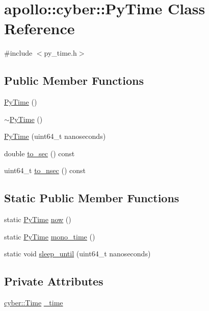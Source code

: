 \hypertarget{classapollo_1_1cyber_1_1PyTime}{\section{apollo\-:\-:cyber\-:\-:Py\-Time Class Reference}
\label{classapollo_1_1cyber_1_1PyTime}
}


{\ttfamily \#include $<$py\-\_\-time.\-h$>$}

\subsection*{Public Member Functions}
\begin{DoxyCompactItemize}
\item 
\hyperlink{classapollo_1_1cyber_1_1PyTime_a35a7960faebd80925edf9c5df85a3b88}{Py\-Time} ()
\item 
\hyperlink{classapollo_1_1cyber_1_1PyTime_a5d2dc973e2d3628f9514b574cd9bc074}{$\sim$\-Py\-Time} ()
\item 
\hyperlink{classapollo_1_1cyber_1_1PyTime_aed9e55ac8f5b448b52187cd417013163}{Py\-Time} (uint64\-\_\-t nanoseconds)
\item 
double \hyperlink{classapollo_1_1cyber_1_1PyTime_a04d9998cb3c386d3e64f6132f3560e5a}{to\-\_\-sec} () const 
\item 
uint64\-\_\-t \hyperlink{classapollo_1_1cyber_1_1PyTime_aaee5bf444eb9893d53ca6be52712ead5}{to\-\_\-nsec} () const 
\end{DoxyCompactItemize}
\subsection*{Static Public Member Functions}
\begin{DoxyCompactItemize}
\item 
static \hyperlink{classapollo_1_1cyber_1_1PyTime}{Py\-Time} \hyperlink{classapollo_1_1cyber_1_1PyTime_ab3922162b6432f44898639ef8fab5ff3}{now} ()
\item 
static \hyperlink{classapollo_1_1cyber_1_1PyTime}{Py\-Time} \hyperlink{classapollo_1_1cyber_1_1PyTime_aace1333e57ef043d5e41688f4174310e}{mono\-\_\-time} ()
\item 
static void \hyperlink{classapollo_1_1cyber_1_1PyTime_af94ea36cd771a1c6c41965d73368576f}{sleep\-\_\-until} (uint64\-\_\-t nanoseconds)
\end{DoxyCompactItemize}
\subsection*{Private Attributes}
\begin{DoxyCompactItemize}
\item 
\hyperlink{classapollo_1_1cyber_1_1Time}{cyber\-::\-Time} \hyperlink{classapollo_1_1cyber_1_1PyTime_ae22840a7f27e2cc823029cb25c40e621}{\-\_\-time}
\end{DoxyCompactItemize}


